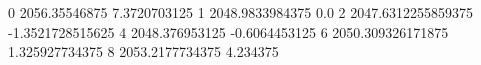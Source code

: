 0 2056.35546875 7.3720703125
1 2048.9833984375 0.0
2 2047.6312255859375 -1.3521728515625
4 2048.376953125 -0.6064453125
6 2050.309326171875 1.325927734375
8 2053.2177734375 4.234375
